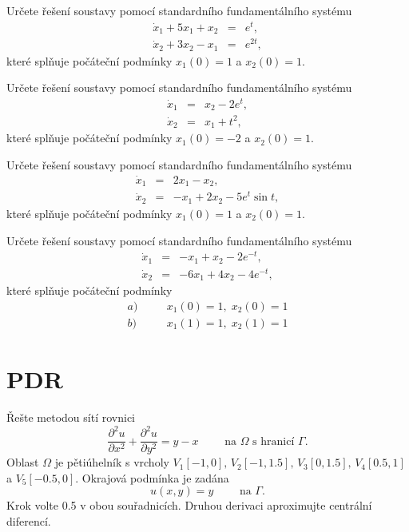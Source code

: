 \documentclass[a4paper,10pt]{book}
\begin{document}
\exercise \label{ex:ode4} Určete řešení soustavy pomocí standardního fundamentálního systému
\begin{eqnarray*}
\dot{x}_1 + 5x_1 + x_2 &=& e^t  ,\\
\dot{x}_2 + 3x_2 - x_1 &=& e^{2t} ,
\end{eqnarray*}
které splňuje počáteční podmínky $x_1(0)=1$ a $x_2(0)=1$.

\exercise \label{ex:ode5} Určete řešení soustavy pomocí standardního fundamentálního systému
\begin{eqnarray*}
\dot{x}_1 &=& x_2 - 2e^t ,\\
\dot{x}_2 &=& x_1 + t^2  ,
\end{eqnarray*}
které splňuje počáteční podmínky $x_1(0)=-2$ a $x_2(0)=1$.

\exercise \label{ex:ode6} Určete řešení soustavy pomocí standardního fundamentálního systému
\begin{eqnarray*}
\dot{x}_1 &=& 2x_1 - x_2 ,\\
\dot{x}_2 &=& -x_1 + 2x_2 - 5e^t \sin t ,
\end{eqnarray*}
které splňuje počáteční podmínky $x_1(0)=1$ a $x_2(0)=1$.

\exercise \label{ex:ode7} Určete řešení soustavy pomocí standardního fundamentálního systému
\begin{eqnarray*}
\dot{x}_1 &=& -x_1 + x_2 -2e^{-t},\\
\dot{x}_2 &=& -6x_1 + 4x_2 - 4e^{-t},
\end{eqnarray*}
které splňuje počáteční podmínky 
\begin{eqnarray*}
  a)&\quad& x_1(0)=1,\; x_2(0)=1 \\
  b)&\quad& x_1(1)=1,\; x_2(1)=1 
\end{eqnarray*}




\chapter{PDR}

\exercise \label{ex:pde1} Řešte metodou sítí rovnici 
\begin{equation*}
\frac{\partial^2 u}{\partial x^2} + \frac{\partial^2 u}{\partial y^2} = y-x \qquad \textrm{ na } \Omega \textrm{ s hranicí } \Gamma.
\end{equation*}
Oblast $\Omega$ je pětiúhelník s vrcholy $V_1[-1,0],\,V_2[-1,1.5],\,V_3[0,1.5],\,V_4[0.5,1]$ a $V_5[-0.5,0]$. Okrajová podmínka je zadána
\begin{equation*}
u(x,y) = y \qquad \textrm{ na } \Gamma.
\end{equation*}
Krok volte 0.5 v obou souřadnicích. Druhou derivaci aproximujte centrální diferencí.
\end{document}
